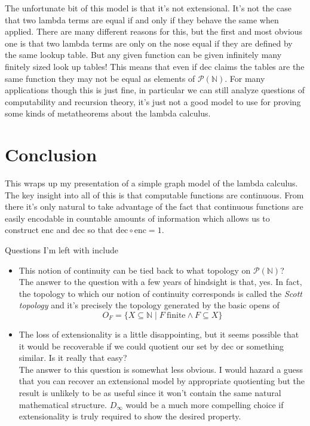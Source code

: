 \documentclass{amsart}
\newcommand{\enc}{\text{enc}}
\newcommand{\dec}{\text{dec}}
\begin{document}
The unfortunate bit of this model is that it's not extensional. It's
not the case that two lambda terms are equal if and only if they
behave the same when applied. There are many different reasons for
this, but the first and most obvious one is that two lambda terms are
only on the nose equal if they are defined by the same lookup
table. But any given function can be given infinitely many finitely
sized look up tables! This means that even if $\dec$ claims the tables
are the same function they may not be equal as elements of
$\mathcal{P}(\mathbb{N})$. For many applications though this is just
fine, in particular we can still analyze questions of computability
and recursion theory, it's just not a good model to use for proving
some kinds of metatheorems about the lambda calculus.

\section{Conclusion}

This wraps up my presentation of a simple graph model of the lambda
calculus. The key insight into all of this is that computable
functions are continuous. From there it's only natural to take
advantage of the fact that continuous functions are easily encodable
in countable amounts of information which allows us to construct
$\enc$ and $\dec$ so that $\dec \circ \enc = 1$.

Questions I'm left with include

\begin{itemize}
\item This notion of continuity can be tied back to what topology on
  $\mathcal{P}(\mathbb{N})$?\\

  The answer to the question with a few years of hindsight is that,
  yes. In fact, the topology to which our notion of continuity
  corresponds is called the \emph{Scott topology} and it's precisely
  the topology generated by the basic opens of
  \[
    O_F = \{X \subseteq \mathbb{N} \mid F\ \mathrm{finite} \mathrel{\wedge} F \subseteq X\}
  \]
\item The loss of extensionality is a little disappointing, but it
  seems possible that it would be recoverable if we could quotient our
  set by $\dec$ or something similar. Is it really that easy?\\

  The answer to this question is somewhat less obvious. I would hazard
  a guess that you can recover an extensional model by appropriate
  quotienting but the result is unlikely to be as useful since it
  won't contain the same natural mathematical structure. $D_\infty$
  would be a much more compelling choice if extensionality is truly
  required to show the desired property.
\end{itemize}
\end{document}
